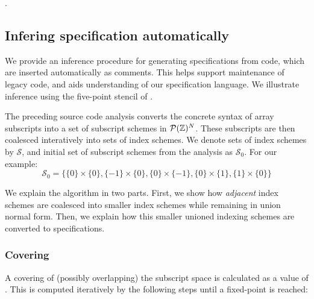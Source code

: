 .


\subsection{Infering specification automatically}
\label{subsec:inference}
%
We provide an inference procedure for generating specifications from
code, which are inserted automatically as comments. This helps support
maintenance of legacy code, and aids understanding of our
specification language. We illustrate inference using the
five-point stencil of .

The preceding source code analysis converts the concrete syntax of
array subscripts into a set of subscript schemes in
$\mathcal{P}(\textnormal{$\mathbb{Z}$})^N$. These subscripts are then coalesced interatively
into sets of index schemes. We denote sets of index schemes by
$\mathcal{S}$, and initial set of subscript schemes from the analysis
as $\mathcal{S}_0$. For our example:
%
\begin{equation*}
\mathcal{S}_0 = \{\{0\} \times \{0\}, \{-1\} \times \{0\},
\{0\} \times \{-1\}, \{0\} \times \{1\}, \{1\} \times \{0\}\}
\end{equation*}


We explain the algorithm in two parts. First, we show how \emph{adjacent} index
schemes are coalesced into smaller index schemes while remaining in union normal
form. Then, we explain how this smaller unioned indexing schemes are converted
to specifications.

\subsubsection{Covering}
A covering of (possibly overlapping) the subscript space
is calculated as a value of . This is computed iteratively
by the following steps until a fixed-point is reached:

